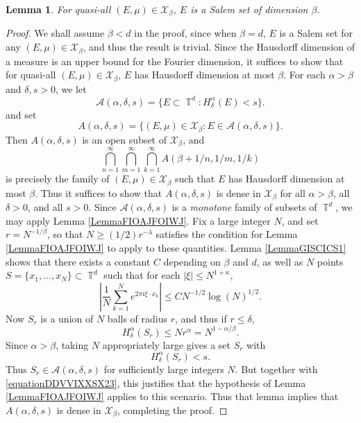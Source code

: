 \documentclass[dvipsnames,letterpaper,12pt]{article}
\numberwithin{equation}{section}
\DeclareMathOperator{\TT}{\mathbb{T}}
\newtheorem{lemma}[theorem]{Lemma}
\numberwithin{theorem}{section}
\begin{document}
\begin{lemma} \label{lemmaoiajdoijwdowaj}
    For quasi-all $(E,\mu) \in \mathcal{X}_\beta$, $E$ is a Salem set of dimension $\beta$.
\end{lemma}
\begin{proof}
    We shall assume $\beta < d$ in the proof, since when $\beta = d$, $E$ is a Salem set for any $(E,\mu) \in \mathcal{X}_\beta$, and thus the result is trivial. Since the Hausdorff dimension of a measure is an upper bound for the Fourier dimension, it suffices to show that for quasi-all $(E,\mu) \in \mathcal{X}_\beta$, $E$ has Hausdorff dimension at most $\beta$. For each $\alpha > \beta$ and $\delta, s > 0$, we let
    \[ \mathcal{A}(\alpha,\delta,s) = \{ E \subset \TT^d: H^\alpha_\delta(E) < s \}. \]
    and set
    \[ A(\alpha,\delta,s) = \{ (E,\mu) \in \mathcal{X}_\beta: E \in \mathcal{A}(\alpha,\delta,s) \}. \]
    Then $A(\alpha,\delta,s)$ is an open subset of $\mathcal{X}_\beta$, and
    \begin{equation}
        \bigcap_{n = 1}^\infty \bigcap_{m = 1}^\infty \bigcap_{k = 1}^\infty A(\beta + 1/n, 1/m, 1/k)
    \end{equation}
    is precisely the family of $(E,\mu) \in \mathcal{X}_\beta$ such that $E$ has Hausdorff dimension at most $\beta$. Thus it suffices to show that $A(\alpha,\delta,s)$ is dense in $\mathcal{X}_\beta$ for all $\alpha > \beta$, all $\delta > 0$, and all $s > 0$. Since $\mathcal{A}(\alpha,\delta,s)$ is a \emph{monotone} family of subsets of $\TT^d$, we may apply Lemma \ref{LemmaFIOAJFOIWJ}. Fix a large integer $N$, and set $r = N^{-1/\beta}$, so that $N \geq (1/2) r^{-\lambda}$ satisfies the condition for Lemma \ref{LemmaFIOAJFOIWJ} to apply to these quantities. Lemma \ref{LemmaGISCICS1} shows that there exists a constant $C$ depending on $\beta$ and $d$, as well as $N$ points $S = \{ x_1, \dots, x_N \} \subset \TT^d$ such that for each $|\xi| \leq N^{1 + \kappa}$,
    \begin{equation} \label{equationDDVVIXXSX23}
        \left| \frac{1}{N} \sum_{k = 1}^N e^{2 \pi i \xi \cdot x_k} \right| \leq C N^{-1/2} \log(N)^{1/2}.
    \end{equation}
    Now $S_r$ is a union of $N$ balls of radius $r$, and thus if $r \leq \delta$,
    \begin{equation}
        H^\alpha_\delta(S_r) \leq N r^\alpha = N^{1 - \alpha / \beta}.
    \end{equation}
    Since $\alpha > \beta$, taking $N$ appropriately large gives a set $S_r$ with
    \begin{equation}
        H^\alpha_\delta(S_r) < s.
    \end{equation}
    Thus $S_r \in \mathcal{A}(\alpha,\delta,s)$ for sufficiently large integers $N$. But together with \eqref{equationDDVVIXXSX23}, this justifies that the hypothesis of Lemma \ref{LemmaFIOAJFOIWJ} applies to this scenario. Thus that lemma implies that $A(\alpha,\delta,s)$ is dense in $\mathcal{X}_\beta$, completing the proof.
\end{proof}
\end{document}
